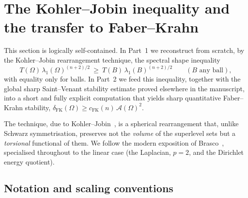 \documentclass[11pt]{amsart}
\theoremstyle{definition}
\newcommand{\Om}{\Omega}
\newcommand{\Fr}{\mathcal A}
\begin{document}

\section{The Kohler--Jobin inequality and the transfer to Faber--Krahn}
\label{sec:kj}

This section is logically self-contained. In Part~1 we reconstruct from
scratch, by the Kohler--Jobin rearrangement technique, the spectral shape
inequality
\[
  T(\Om)\,\lambda_1(\Om)^{(n+2)/2}\ \ge\ T(B)\,\lambda_1(B)^{(n+2)/2}
  \qquad(B\text{ any ball}),
\]
with equality only for balls. In Part~2 we feed this inequality, together
with the global sharp Saint--Venant stability estimate proved elsewhere in
the manuscript, into a short and fully explicit computation that yields
sharp quantitative Faber--Krahn stability,
$\delta_{\mathrm{FK}}(\Om)\ge c_{\mathrm{FK}}(n)\,\Fr(\Om)^2$.

The technique, due to Kohler--Jobin~\cite{KJ1,KJ2,KJ3}, is a spherical
rearrangement that, unlike Schwarz symmetrisation, preserves not the
\emph{volume} of the superlevel sets but a \emph{torsional} functional of
them. We follow the modern exposition of Brasco~\cite[\S\S3--5,
Thm.~1.1]{Brasco2014}, specialised throughout to the linear case (the
Laplacian, $p=2$, and the Dirichlet energy quotient).

\subsection{Notation and scaling conventions}
\label{ssec:kj-notation}
\end{document}
